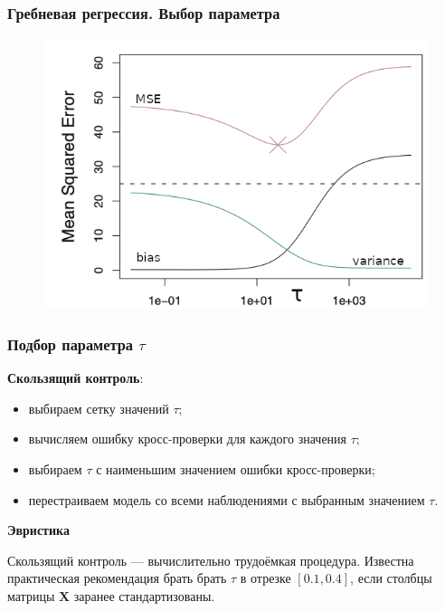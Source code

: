 \documentclass[ucs, notheorems, handout]{beamer}
\begin{document}
\begin{frame}
	\frametitle{Гребневая регрессия. Выбор параметра}
	
	
			\begin{figure}[]
				\includegraphics[width=1\textwidth]{ridge2.png}
			\end{figure}

	\note{
		
	}
\end{frame}

\begin{frame}
	\frametitle{Подбор параметра $\tau$ }
	
	\textbf{Скользящий контроль}:%
	\begin{itemize}
		\item выбираем сетку значений $\tau$;
		\item вычисляем ошибку кросс-проверки для каждого значения $\tau$;
		\item выбираем $\tau$ с наименьшим значением ошибки кросс-проверки;
		\item перестраиваем модель со всеми наблюдениями с выбранным значением $\tau$.
	\end{itemize}
	
	\textbf{Эвристика }
	
	Скользящий контроль --- вычислительно трудоёмкая процедура. Известна практическая рекомендация брать брать $\tau$ в отрезке $[0.1, 0.4]$, если столбцы матрицы $\bm{X}$ заранее стандартизованы.
	
\end{frame}
\end{document}
